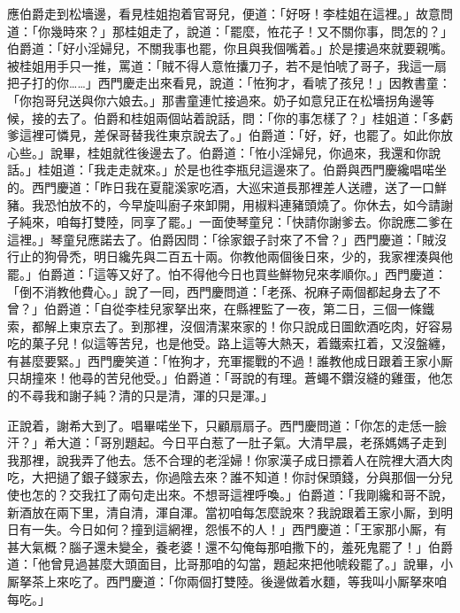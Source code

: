 應伯爵走到松墻邊，看見桂姐抱着官哥兒，便道：「好呀！李桂姐在這裡。」故意問道：「你幾時來？」{}那桂姐走了，說道：「罷麼，恠花子！又不關你事，問怎的？」伯爵道：「好小淫婦兒，不關我事也罷，你且與我個嘴着。」於是摟過來就要親嘴。被桂姐用手只一推，罵道：「賊不得人意恠攮刀子，若不是怕唬了哥子，我這一扇把子打的你……」西門慶走出來看見，說道：「恠狗才，看唬了孩兒！」因教書童：「你抱哥兒送與你六娘去。」那書童連忙接過來。奶子如意兒正在松墻拐角邊等候，接的去了。伯爵和桂姐兩個站着說話，問：「你的事怎樣了？」桂姐道：「多虧爹這裡可憐見，差保哥替我徃東京說去了。」伯爵道：「好，好，也罷了。如此你放心些。」說畢，桂姐就徃後邊去了。伯爵道：「恠小淫婦兒，你過來，我還和你說話。」桂姐道：「我走走就來。」於是也徃李瓶兒這邊來了。伯爵與西門慶纔唱喏坐的。西門慶道：「昨日我在夏龍溪家吃酒，大巡宋道長那裡差人送禮，送了一口鮮豬。{}我恐怕放不的，今早旋叫廚子來卸開，用椒料連豬頭燒了。你休去，如今請謝子純來，咱每打雙陸，同享了罷。」一面使琴童兒：「快請你謝爹去。你說應二爹在這裡。」琴童兒應諾去了。伯爵因問：「徐家銀子討來了不曾？」西門慶道：「賊沒行止的狗骨禿，明日纔先與二百五十兩。你教他兩個後日來，少的，我家裡湊與他罷。」伯爵道：「這等又好了。怕不得他今日也買些鮮物兒來孝順你。」西門慶道：「倒不消教他費心。」說了一囘，西門慶問道：「老孫、祝麻子兩個都起身去了不曾？」伯爵道：「自從李桂兒家拏出來，在縣裡監了一夜，第二日，三個一條鐵索，都解上東京去了。到那裡，沒個清潔來家的！你只說成日圖飲酒吃肉，好容易吃的菓子兒！似這等苦兒，也是他受。路上這等大熱天，着鐵索扛着，又沒盤纏，有甚麼要緊。」{}西門慶笑道：「恠狗才，充軍擺戰的不過！誰教他成日跟着王家小厮只胡撞來！他尋的苦兒他受。」伯爵道：「哥說的有理。蒼蠅不鑽沒縫的雞蛋，他怎的不尋我和謝子純？清的只是清，渾的只是渾。」

正說着，謝希大到了。唱畢喏坐下，只顧扇扇子。西門慶問道：「你怎的走恁一臉汗？」希大道：「哥別題起。今日平白惹了一肚子氣。大清早晨，老孫媽媽子走到我那裡，說我弄了他去。恁不合理的老淫婦！你家漢子成日摽着人在院裡大酒大肉吃，大把撾了銀子錢家去，你過陰去來？誰不知道！你討保頭錢，分與那個一分兒使也怎的？{}交我扛了兩句走出來。不想哥這裡呼喚。」伯爵道：「我剛纔和哥不說，新酒放在兩下里，清自清，渾自渾。當初咱每怎麼說來？我說跟着王家小厮，到明日有一失。今日如何？撞到這網裡，怨悵不的人！」西門慶道：「王家那小厮，有甚大氣概？腦子還未變全，養老婆！還不勾俺每那咱撒下的，羞死鬼罷了！」伯爵道：「他曾見過甚麼大頭面目，比哥那咱的勾當，題起來把他唬殺罷了。」{}說畢，小厮拏茶上來吃了。西門慶道：「你兩個打雙陸。後邊做着水麵，等我叫小厮拏來咱每吃。」

